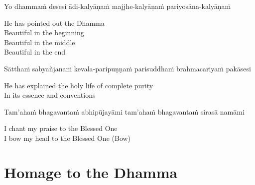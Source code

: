 \begin{pali-hang}
  Yo dhammaṁ desesi ādi-kalyāṇaṁ majjhe-kalyāṇaṁ pariyosāna-kalyāṇaṁ
\end{pali-hang}

\begin{english-verses}
  He has pointed out the Dhamma\\
  Beautiful in the beginning\\
  Beautiful in the middle\\
  Beautiful in the end\\
\end{english-verses}

\begin{pali-hang}
  Sātthaṁ sabyañjanaṁ kevala-paripuṇṇaṁ parisuddhaṁ brahmacariyaṁ pakāsesi
\end{pali-hang}

\begin{english}
  He has explained the holy life of complete purity\ifdigitalversion\makeatletter\hyperlink{endnote4-appendix}\makeatother\fi\\
  In its essence and conventions
\end{english}

\suttaRef{[SN 55.7]}

\begin{pali-hang}
  Tam'ahaṁ bhagavantaṁ abhipūjayāmi tam'ahaṁ bhagavantaṁ sirasā namāmi
\end{pali-hang}

\begin{english}
  I chant my praise to the Blessed One\\
  I bow my head to the Blessed One \hfill{\textnormal{\ifafiveversion\fontsize{12.5}{18}\fi\ifasixversion\fontsize{9}{13}\fi\selectfont (Bow)}}
\end{english}

\suttaRef{[Thai]}

\section{Homage to the Dhamma}
\label{homage-dhamma}

